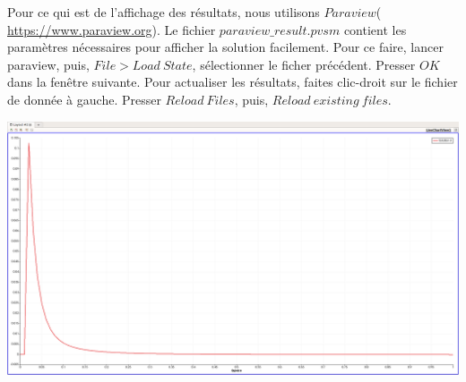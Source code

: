 \documentclass[a4paper,french,10pt]{article}
\begin{document}
    Pour ce qui est de l'affichage des résultats, nous utilisons $Paraview$( \url{https://www.paraview.org}). Le fichier $paraview\_result.pvsm$ contient les paramètres nécessaires pour afficher la solution facilement. Pour ce faire, lancer paraview, puis, $File>Load~State$, sélectionner le ficher précédent. Presser $OK$ dans la fenêtre suivante. Pour actualiser les résultats, faites clic-droit sur le fichier de donnée à gauche. Presser $Reload ~Files$, puis, $Reload~existing~files$.
    
    
 \includegraphics[scale=0.2]{image.png}
\end{document}
